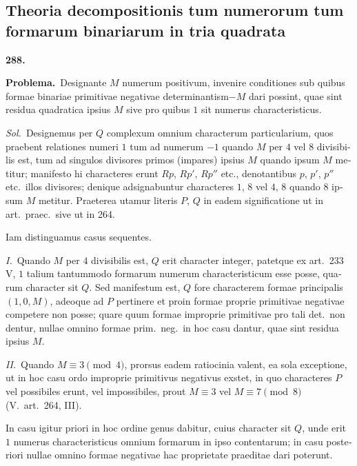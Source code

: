 \documentclass[12pt,a4paper]{article}
\theoremstyle{plain}
\theoremstyle{definition}
\theoremstyle{remark}
\begin{document}
\begin{otherlanguage}{latin}

\subsection*{Theoria decompositionis tum numerorum tum formarum binariarum in tria quadrata}

\textbf{288.}

\textbf{Problema.}\ Designante $M$ numerum positivum, invenire conditiones sub quibus formae binariae primitivae negativae determinantism$-M$ dari possint, quae sint residua quadratica ipsius $M$ sive pro quibus $1$ sit numerus characteristicus.

\textit{Sol.}\ Designemus per $Q$ complexum omnium characterum particularium, quos praebent relationes numeri $1$ tum ad numerum $-1$ quando $M$ per $4$ vel $8$ divisibilis est, tum ad singulos divisores primos (impares) ipsius $M$ quando ipsum $M$ metitur; manifesto hi characteres erunt $Rp$, $Rp'$, $Rp''$ etc., denotantibus $p$, $p'$, $p''$ etc.\ illos divisores; denique adsignabuntur characteres $1$, $8$ vel $4$, $8$ quando $8$ ipsum $M$ metitur. Praeterea utamur literis $P$, $Q$ in eadem significatione ut in art.\ praec.\ sive ut in 264.

Iam distinguamus casus sequentes.

\textit{I.}\ Quando $M$ per $4$ divisibilis est, $Q$ erit character integer, patetque ex art.\ 233 V, $1$ talium tantummodo formarum numerum characteristicum esse posse, quarum character sit $Q$. Sed manifestum est, $Q$ fore characterem formae principalis $(1, 0, M)$, adeoque ad $P$ pertinere et proin formae proprie primitivae negativae competere non posse; quare quum formae improprie primitivae pro tali det.\ non dentur, nullae omnino formae prim.\ neg.\ in hoc casu dantur, quae sint residua ipsius $M$.

\textit{II.}\ Quando $M \equiv 3 \pmod{4}$, prorsus eadem ratiocinia valent, ea sola exceptione, ut in hoc casu ordo improprie primitivus negativus exstet, in quo characteres $P$ vel possibiles erunt, vel impossibiles, prout $M \equiv 3$ vel $M \equiv 7 \pmod{8}$ (V.\ art.\ 264, III).

In casu igitur priori in hoc ordine genus dabitur, cuius character sit $Q$, unde erit $1$ numerus characteristicus omnium formarum in ipso contentarum; in casu posteriori nullae omnino formae negativae hac proprietate praeditae dari poterunt.


\end{otherlanguage}
\end{document}
